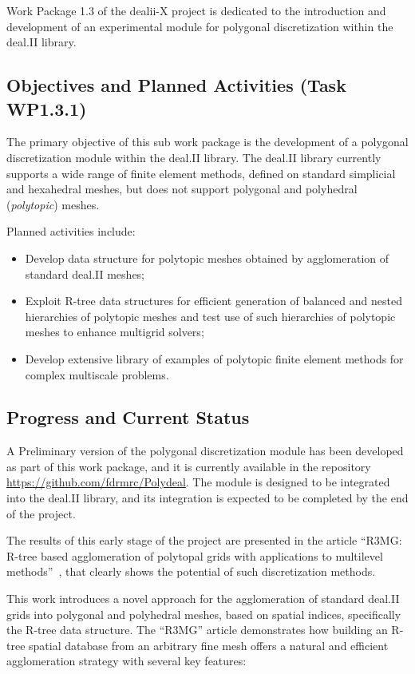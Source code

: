 \documentclass[a4paper,12pt]{article}
\begin{document}
Work Package 1.3 of the dealii-X project is dedicated to the introduction and
development of an experimental module for polygonal discretization within the
deal.II library. 

\subsection{Objectives and Planned Activities (Task WP1.3.1)}

The primary objective of this sub work package is the development of a polygonal
discretization module within the deal.II library. The deal.II library currently
supports a wide range of finite element methods, defined on standard simplicial
and hexahedral meshes, but does not support polygonal and polyhedral (\emph{polytopic}) meshes.

Planned activities include:
\begin{itemize}
    \item Develop data structure for polytopic meshes obtained by agglomeration of standard deal.II meshes;
	\item Exploit  R-tree data structures for efficient generation of balanced and nested hierarchies of  polytopic meshes and test use of such hierarchies of  polytopic meshes to enhance multigrid solvers;
	\item Develop extensive library of examples of polytopic finite element methods for complex multiscale problems.  
\end{itemize}

 \subsection{Progress and Current Status}

A Preliminary version of the polygonal discretization module has been developed
as part of this work package, and it is currently available in the repository
\url{https://github.com/fdrmrc/Polydeal}. The module is designed to be
integrated into the deal.II library, and its integration is expected to be
completed by the end of the project.

The results of this early stage of the project are presented in the article ``R3MG:
R-tree based agglomeration of polytopal grids with applications to multilevel
methods''~\cite{FederEtAl2025}, that clearly shows the potential of such
discretization methods. 

This work introduces a novel approach for the agglomeration of standard deal.II
grids into polygonal and polyhedral meshes, based on spatial indices,
specifically the R-tree data structure. The ``R3MG'' article demonstrates how
building an R-tree spatial database from an arbitrary fine mesh offers a natural
and efficient agglomeration strategy with several key features: 
\end{document}
